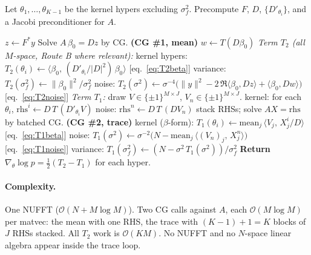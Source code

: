 \documentclass[11pt]{article}
\numberwithin{equation}{section}
\newcommand{\bigo}{\mathcal{O}}
\newcommand{\Amean}{A}
\begin{document}
Let $\theta_1,\dots,\theta_{K-1}$ be the kernel hypers excluding $\sigma_f^2$.
Precompute $F$, $D$, $\{D'_{\theta_i}\}$, and a Jacobi preconditioner for
$\Amean$.

\begin{algorithm}[h]
\caption{EFGP log-marginal gradient: one NUFFT, two CG calls.}
\begin{algorithmic}[1]
\State $z \leftarrow F^*y$ 
\State Solve $\Amean\,\beta_0 = D z$ by CG. \hfill\textbf{(CG \#1, mean)}
\State $w \leftarrow T(D\beta_0)$ 
\Statex\hrulefill
\State \emph{Term $T_2$ (all $M$-space, Route B where relevant):}
\State \quad kernel hypers: $T_2(\theta_i) \leftarrow \langle\beta_0,\,(D'_{\theta_i}/|D|^2)\,\beta_0\rangle$  \hfill [eq.~\eqref{eq:T2beta}]
\State \quad variance:      $T_2(\sigma_f^2) \leftarrow \|\beta_0\|^2/\sigma_f^2$
\State \quad noise:         $T_2(\sigma^2) \leftarrow \sigma^{-4}\bigl(\|y\|^2 - 2\,\Re\langle\beta_0, Dz\rangle + \langle\beta_0, Dw\rangle\bigr)$ \hfill [eq.~\eqref{eq:T2noise}]
\Statex\hrulefill
\State \emph{Term $T_1$:} draw $V\in\{\pm1\}^{M\times J}$, $V_n\in\{\pm1\}^{M\times J}$.
\State \quad kernel: for each $\theta_i$, $\mathrm{rhs}^i \leftarrow D\,T\,(D'_{\theta_i}V)$
\State \quad noise:  $\mathrm{rhs}^n \leftarrow D\,T\,(D V_n)$
\State \quad stack RHSs; solve $\Amean X = \mathrm{rhs}$ by batched CG. \hfill\textbf{(CG \#2, trace)}
\State \quad kernel ($\beta$-form): $T_1(\theta_i) \leftarrow \mathrm{mean}_j\,\langle V_j,\,X^i_j/D\rangle$  \hfill [eq.~\eqref{eq:T1beta}]
\State \quad noise:  $T_1(\sigma^2) \leftarrow \sigma^{-2}\bigl(N - \mathrm{mean}_j\,\langle (V_n)_j,\,X^n_j\rangle\bigr)$  \hfill [eq.~\eqref{eq:T1noise}]
\State \quad variance: $T_1(\sigma_f^2) \leftarrow (N - \sigma^2\,T_1(\sigma^2))/\sigma_f^2$
\Statex\hrulefill
\State \textbf{Return} $\nabla_\theta\log p = \tfrac12(T_2 - T_1)$ for each hyper.
\end{algorithmic}
\end{algorithm}

\paragraph{Complexity.} One NUFFT ($\bigo(N + M\log M)$). Two CG calls against
$\Amean$, each $\bigo(M\log M)$ per matvec: the mean with one RHS, the trace
with $(K\!-\!1)\!+\!1 = K$ blocks of $J$ RHSs stacked. All $T_2$ work is
$\bigo(KM)$. No NUFFT and no $N$-space linear algebra appear inside the trace
loop.
\end{document}
